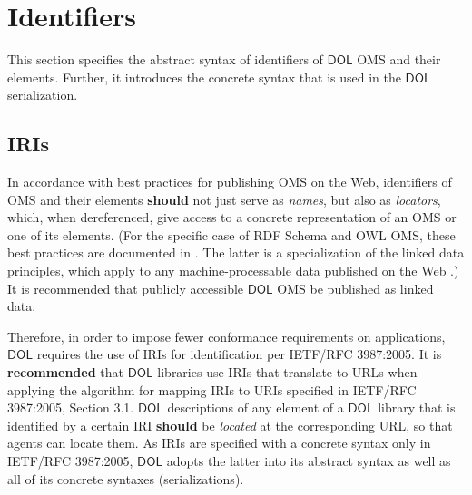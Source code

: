 \documentclass[10pt,fleqn,final]{scrreprt}
\makeatletter
\newcommand{\cbs}[0]{\color{red}\xspace} %
\newcommand{\cbe}[0]{\color{black}\xspace} %
\newcommand*\CommentAuthor{}
\renewcommand*\CommentAuthor{#1}}
\newcommand*\CommentDate{}
\renewcommand*\CommentDate{#1}}
\newcommand*\CommentId{}
\renewcommand*\CommentId{#1}}
\newcommand*\CommentType{}
\renewcommand*\CommentType{#1}}
\newcommand*{\SetCommentColorByType}[1]{%
\edef\localType{{#1}}%
\expandafter\ifstrequal\localType{q-aut}{\colorlet{CommentColor}{red}}{%
\expandafter\ifstrequal\localType{q-all}{\colorlet{CommentColor}{orange}}{%
\expandafter\ifstrequal\localType{todo}{\colorlet{CommentColor}{orange}}{%
\expandafter\ifstrequal\localType{fyi}{\colorlet{CommentColor}{lightgray}}{%
\colorlet{CommentColor}{yellow}}}}}}
\newcommand*{\SetCommentPrefixByType}[1]{%
\edef\localType{{#1}}%
\expandafter\@ifmtarg\localType{%
\edef\CommentPrefix{}%
}{%
\caseupper[q]{#1}%
\edef\CommentPrefix{\thestring: }%
}}
\newcommand*{\initComment}[1]{%
\setkeys{Comment}{#1}%
\SetCommentColorByType{\CommentType}%
\relax%
\SetCommentPrefixByType{\CommentType}%
\relax%
}
\newcommand*{\todonote}[2][]{%
\initComment{#1}%
\pdfcomment[author=\CommentAuthor,color=CommentColor,date=\CommentDate,id=\CommentId]{%
\CommentPrefix
#2}}
\renewcommand*{\todonote}[2][]{%
\initComment{#1}%
\ednote{\CommentPrefix #2}}
\newcommand*{\CLnote}[2][author=Christoph Lange]{%
\todonote[author=Christoph Lange,#1]{#2} 
}
\newcommand*{\recommended}{\textbf{recommended}\xspace}
\newcommand*{\should}{\textbf{should}\xspace}
\newcommand*{\IS}{OMG Specification\xspace}
\newcommand*{\DOL}{\ensuremath{\mathsf{DOL}}\xspace}
\newcommand{\sclause}[1]{\section{#1}}
\newcommand{\ssclause}[1]{\subsection{#1}}
\newcommand{\nisref}[1]{#1}
\newenvironment{definitions}[0]{\medskip }{}
\makeatother
\begin{document}
\begin{definitions}
\sclause{Identifiers}\label{c:identifiers}
This section specifies the abstract syntax of identifiers of \DOL OMS and their elements.\cbs Further, 
it introduces the concrete syntax that is used in the \DOL serialization.\cbe 

\ssclause{IRIs}\label{c:iris}

In accordance with best practices for publishing OMS on the Web, identifiers of OMS and their 
elements \should not just serve as \emph{names}, but also as \emph{locators}, which, when 
dereferenced, give access to a concrete representation of an OMS or one of its elements.  (For the 
specific case of RDF Schema and OWL OMS, these best practices are documented in 
\cite{W3C:NOTE-swbp-vocab-pub-20080828}.  The latter is a specialization of the linked data 
principles, which apply to any machine-processable data published on the Web 
\cite{BernersLee:LinkedData2006}.)  It is recommended that publicly accessible \DOL OMS be published 
as linked data.

Therefore, in order to impose fewer conformance requirements on applications, \DOL requires the use of
 IRIs for identification per \nisref{IETF/RFC 3987:2005}.
  It is \recommended that \DOL libraries use 
IRIs that translate to URLs when applying the algorithm for mapping IRIs to URIs specified in 
\nisref{IETF/RFC 3987:2005, Section 3.1}.  \DOL descriptions of any element of a \DOL library that is 
identified by a certain IRI \should be \emph{located} at the corresponding URL, so that agents can 
locate them.  As IRIs are specified with a concrete syntax only in \nisref{IETF/RFC 3987:2005}, \DOL 
adopts the latter into its abstract syntax as well as all of its concrete syntaxes 
(serializations).




\end{definitions}
\end{document}

